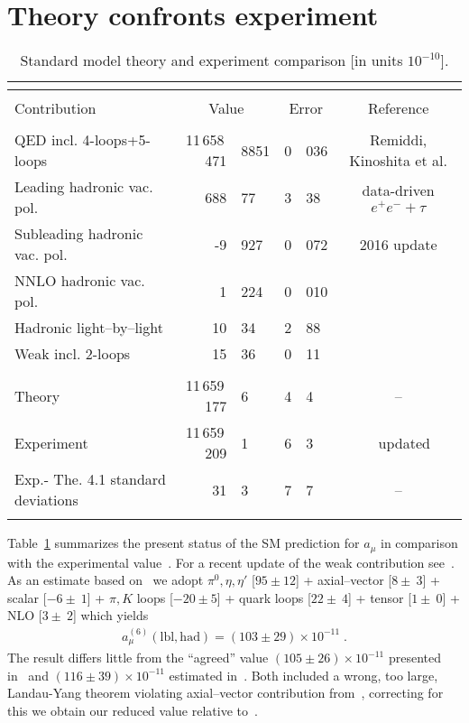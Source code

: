 \documentclass[epj,onecolumn]{webofc}
\newcommand{\epm}{e^+e^- }
\newcommand{\power}[1]{\times 10^{#1} }
\newcommand{\amu}{a_\mu }
\newcommand{\bea}{\begin{eqnarray}}
\newcommand{\eea}{\end{eqnarray}}
\newcommand{\epo}{\;. }
\newcommand{\ttc}[1]{\multicolumn{2}{c}{#1}}
\begin{document}
\section{Theory confronts experiment}
\label{sec-7}
\begin{table}[h]
\vspace*{-4mm}
\caption{Standard model theory and experiment comparison [in units $10^{-10}$].}
\label{tab:amucontrubitionsummary}
\centering
\small
\begin{tabular}{lr@{ .}lr@{ .}lc}
&\ttc{}&\ttc{}&\\
\hline
&\ttc{}&\ttc{}&\\
Contribution & \multicolumn{2}{c}{Value} & \multicolumn{2}{c}{Error} & Reference \\
&\ttc{}&\ttc{}&\\
\hline\noalign{\smallskip}
QED incl. 4-loops+5-loops & { 11\,658\,471}&{ 8851} & {
0}&{ 036} & Remiddi, Kinoshita et al.\\
Leading hadronic vac. pol.& { 688}&{ 77} & {
3}&{ 38} & data-driven $\epm+\tau$ \\
Subleading hadronic vac. pol. &{ -9}&{ 927 } &
{ 0}&{ 072} & 2016 update  \\
NNLO hadronic vac. pol. &  { 1}&{ 224} &
{ 0}&{ 010} & ~\cite{NNLO}  \\
Hadronic light--by--light &  { 10}&{ 34} & { 2}&{ 88}
& ~\cite{JN,Bijnens:2016hgx} \\
Weak incl. 2-loops & { 15}&{ 36} & { 0}&{ 11} & ~\cite{CMV03,Gnendiger:2013pva}  \\
&\ttc{}&\ttc{}&\\
Theory & { 11\,659\,177}&{ 6} & { 4}&{ 4} & --  \\
Experiment & { 11\,659\,209}&{ 1} & { 6}&{ 3} & ~\cite{BNLfinal} updated  \\
Exp.- The.  {{ 4.1}} standard deviations & { 31}&{ 3}
& { 7}&{ 7} & -- \\ \noalign{\smallskip}\hline
\end{tabular}
\end{table}
Table~\ref{tab:amucontrubitionsummary} summarizes the present status
of the SM prediction for $\amu$ in comparison with the experimental
value~\cite{BNLfinal}. For a recent update of the weak contribution
see~\cite{Gnendiger:2013pva}. As an estimate based
on~\cite{HKS95,BPP1995,KnechtNyffeler01,MV03,JN,Nyffeler:2016xul,Gerardin:2016cqj,Bijnens:2016hgx}
we adopt $\pi^0,\eta,\eta'$ [$95 \pm 12$] + axial--vector [$8 \pm
~3$] + scalar [$-6\pm ~1$] + $\pi,K$ loops [$-20\pm 5$] + quark loops
[$22\pm ~4$] + tensor [$1\pm ~0$] + NLO [$3\pm ~2$] which yields
\bea
 a^{(6)}_\mu(\mathrm{lbl},\mathrm{had})=(103 \pm 29) \power{-11}  \epo
\eea
The result differs little from the ``agreed'' value $(105\pm26)
\power{-11}$ presented in~\cite{PdRV} and $(116\pm39)\power{-11}$
estimated in~\cite{JN}. Both included a wrong, too large, Landau-Yang
theorem violating axial--vector contribution from~\cite{MV03},
correcting for this we obtain our reduced value relative to~\cite{JN}.
\end{document}

